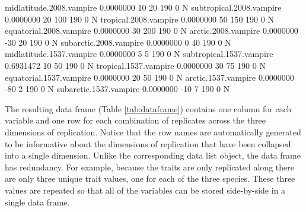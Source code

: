 \documentclass[a4paper]{report}
\begin{document}
\begin{article}
\begin{table*}
\begin{Schunk}
\begin{Soutput}
midlatitude.2008.vampire  0.0000000          10            20       190              0          N
subtropical.2008.vampire  0.0000000          20           100       190              0          N
tropical.2008.vampire     0.0000000          50           150       190              0          N
equatorial.2008.vampire   0.0000000          30           200       190              0          N
arctic.2008.vampire       0.0000000         -30            20       190              0          N
subarctic.2008.vampire    0.0000000           0            40       190              0          N
midlatitude.1537.vampire  0.0000000           5             5       190              0          N
subtropical.1537.vampire  0.6931472          10            50       190              0          N
tropical.1537.vampire     0.0000000          30            75       190              0          N
equatorial.1537.vampire   0.0000000          20            50       190              0          N
arctic.1537.vampire       0.0000000         -80             2       190              0          N
subarctic.1537.vampire    0.0000000         -10             7       190              0          N
\end{Soutput}
\end{Schunk}
\end{table*}



The resulting data frame (Table \ref{tab:dataframe}) contains one column for each variable and one row for each combination of replicates across the three dimensions of replication.  Notice that the row names are automatically generated to be informative about the dimensions of replication that have been collapsed into a single dimension.  Unlike the corresponding data list object, the data frame has redundancy.  For example, because the traits are only replicated along  there are only three unique trait values, one for each of the three species.  These three values are repeated so that all of the variables can be stored side-by-side in a single data frame.


\end{article}
\end{document}
